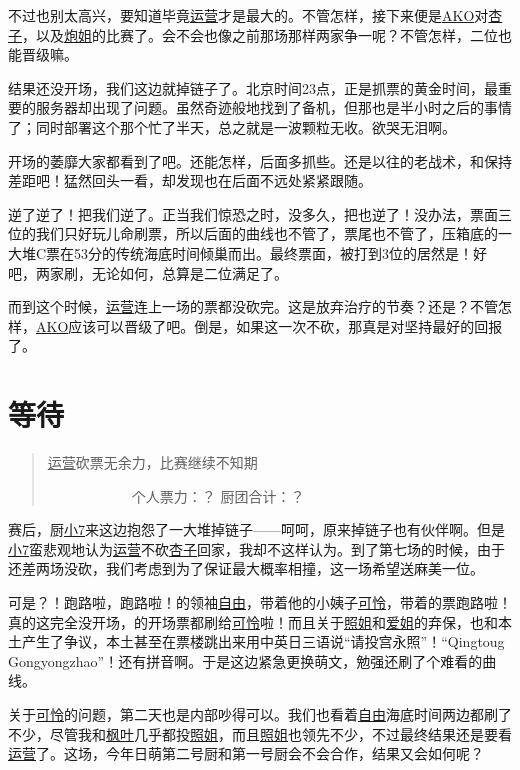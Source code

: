 不过也别太高兴，要知道毕竟\uline{运营}才是最大的。不管怎样，接下来便是\uline{AKO}对\uline{杏子}，以及\uline{炮姐}的比赛了。会不会也像之前那场那样两家争一呢？不管怎样，二位也能晋级嘛。

结果还没开场，我们这边就掉链子了。北京时间23点，正是抓票的黄金时间，最重要的服务器却出现了问题。虽然奇迹般地找到了备机，但那也是半小时之后的事情了；同时部署这个那个忙了半天，总之就是一波颗粒无收。欲哭无泪啊。

开场的萎靡大家都看到了吧。还能怎样，后面多抓些。还是以往的老战术，和保持差距吧！猛然回头一看，却发现也在后面不远处紧紧跟随。

逆了逆了！把我们逆了。正当我们惊恐之时，没多久，把也逆了！没办法，票面三位的我们只好玩儿命刷票，所以后面的曲线也不管了，票尾也不管了，压箱底的一大堆C票在53分的传统海底时间倾巢而出。最终票面，被打到3位的居然是！好吧，两家刷，无论如何，总算是二位满足了。

而到这个时候，\uline{运营}连上一场的票都没砍完。这是放弃治疗的节奏？还是？不管怎样，\uline{AKO}应该可以晋级了吧。倒是，如果这一次不砍，那真是对坚持最好的回报了。

\chapter{等待}
\begin{quote}
\uline{运营}砍票无余力，比赛继续不知期

　　　　　　个人票力：？ 厨团合计：？
\end{quote}

赛后，厨\uline{小7}来这边抱怨了一大堆掉链子——呵呵，原来掉链子也有伙伴啊。但是\uline{小7}蛮悲观地认为\uline{运营}不砍\uline{杏子}回家，我却不这样认为。到了第七场的时候，由于还差两场没砍，我们考虑到为了保证最大概率相撞，这一场希望送麻美一位。

可是？！跑路啦，跑路啦！的领袖\uline{自由}，带着他的小姨子\uline{可怜}，带着的票跑路啦！真的这完全没开场，的开场票都刷给\uline{可怜}啦！而且关于\uline{照姐}和\uline{爱姐}的弃保，也和本土产生了争议，本土甚至在票楼跳出来用中英日三语说“请投宫永照”！“Qingtoug Gongyongzhao”！还有拼音啊。于是这边紧急更换萌文，勉强还刷了个难看的曲线。

关于\uline{可怜}的问题，第二天也是内部吵得可以。我们也看着\uline{自由}海底时间两边都刷了不少，尽管我和\uline{枫叶}几乎都投\uline{照姐}，而且\uline{照姐}也领先不少，不过最终结果还是要看\uline{运营}了。这场，今年日萌第二号厨和第一号厨会不会合作，结果又会如何呢？

